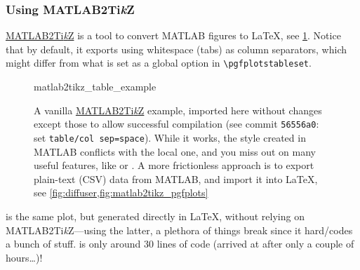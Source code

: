 \subsubsection{Using MATLAB2Ti\textit{k}Z}

\href{https://github.com/matlab2tikz/matlab2tikz}{MATLAB2Ti\textit{k}Z} is a tool to
convert MATLAB figures to \LaTeX{}, see \cref{fig:matlab2tikz_vanilla}.
Notice that by default, it exports using whitespace (tabs) as column separators,
which might differ from what is set as a global option in \verb|\pgfplotstableset|.

\begin{figure}[tbp]
\ContinuedFloat*
    \centering
    {matlab2tikz_table_example}
    \caption[A vanilla MATLAB2Ti\textit{k}Z example]{%
        A vanilla \href{https://github.com/matlab2tikz/matlab2tikz}{MATLAB2Ti\textit{k}Z}
        example, imported here without changes except those to allow successful compilation
        (see commit \texttt{56556a0}: set \texttt{table/col sep=space}).
        While it works, the style created in MATLAB conflicts with the local one,
        and you miss out on many useful features, like  or
        .
        A more frictionless approach is to export plain-text (CSV) data from MATLAB,
        and import it into \LaTeX{}, see \cref{fig:diffuser,fig:matlab2tikz_pgfplots}%
    }
    \label{fig:matlab2tikz_vanilla}
\end{figure}

 is the same plot, but generated directly in \LaTeX{}, without
relying on MATLAB2Ti\textit{k}Z---using the latter, a plethora of things break since it
hard\-/codes a bunch of stuff.
 is only around 30 lines of code (arrived at after only a couple of hours\dots{})!


